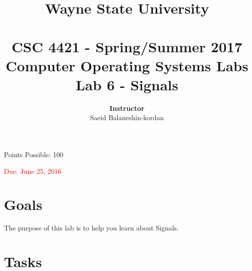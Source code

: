 \documentclass[16pt]{article}
\begin{document}
\title{\huge \textbf{Wayne State University \\
 \vline \\
\Huge CSC 4421 - Spring/Summer 2017 \\
 Computer Operating Systems Labs\\
 Lab 6 - Signals}\\
 \vline
 }
\author{\textbf{Instructor}  \vspace{0.2cm} \\ Saeid Balaneshin-kordan\\
}
\date{}
\maketitle

\begin{center}
\Large Points Possible: 100

\textcolor{red}{Due: June 25, 2016}
\end{center}

\section*{Goals}

The purpose of this lab is to help you learn about Signals.

\section*{Tasks}
\end{document}
